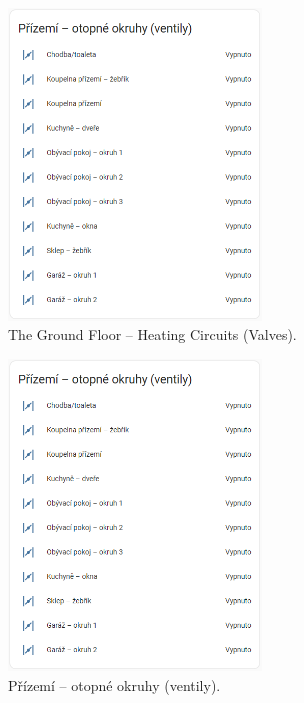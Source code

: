\begin{English}
\begin{figure}[H]
    \centering
    \includegraphics[width=0.6\textwidth]{pictures/czech/software/heating-circuits-ground-floor.png}
    \caption{The Ground Floor – Heating Circuits (Valves).}
    \label{fig:heating-circuits-ground-floor}
\end{figure}
\end{English}

\begin{Czech}
\begin{figure}[H]
    \centering
    \includegraphics[width=0.6\textwidth]{pictures/czech/software/heating-circuits-ground-floor.png}
    \caption{Přízemí – otopné okruhy (ventily).}
    \label{fig:heating-circuits-ground-floor}
\end{figure}
\end{Czech}


